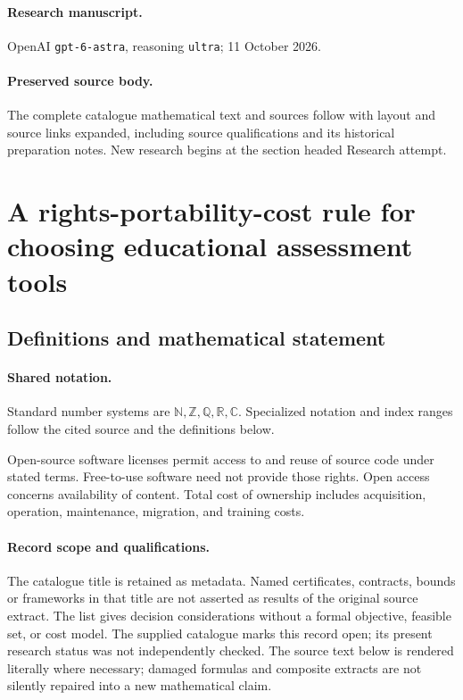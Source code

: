 \documentclass[11pt]{article}
\begin{document}
\paragraph{Research manuscript.} OpenAI \texttt{gpt-6-astra}, reasoning \texttt{ultra}; 11 October 2026.
\paragraph{Preserved source body.} The complete catalogue mathematical text and sources follow with layout and source links expanded, including source qualifications and its historical preparation notes. New research begins at the section headed Research attempt.

\section{A rights-portability-cost rule for choosing educational assessment tools}\label{statement}

\subsection{Definitions and mathematical statement}

\paragraph{Shared notation.}Standard number systems are $\mathbb N,\mathbb Z,\mathbb Q,\mathbb R,\mathbb C$. Specialized notation and index ranges follow the cited source and the definitions below.


Open-source software licenses permit access to and reuse of source code under stated terms. Free-to-use software need not provide those rights. Open access concerns availability of content. Total cost of ownership includes acquisition, operation, maintenance, migration, and training costs.
\paragraph{Record scope and qualifications.}
The catalogue title is retained as metadata. Named certificates, contracts, bounds or frameworks in that title are not asserted as results of the original source extract.
The list gives decision considerations without a formal objective, feasible set, or cost model. The supplied catalogue marks this record open; its present research status was not independently checked.
The source text below is rendered literally where necessary; damaged formulas and composite extracts are not silently repaired into a new mathematical claim.
\end{document}
